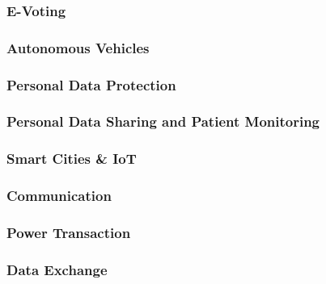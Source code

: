 \subsubsection{E-Voting}
\cite{Osgood2016} \cite{BenAyed2017}
\subsubsection{Autonomous Vehicles}
\cite{Dorri2017} \cite{Rowan2017}
\subsubsection{Personal Data Protection}
\cite{Zyskind2015}

\subsubsection{Personal Data Sharing and Patient Monitoring}
\cite{Yue2016}

\subsubsection{Smart Cities \& IoT}
\cite{Biswas2016}
\subsubsection{Communication}
\cite{Rowan2017}
\subsubsection{Power Transaction}
\subsubsection{Data Exchange}

